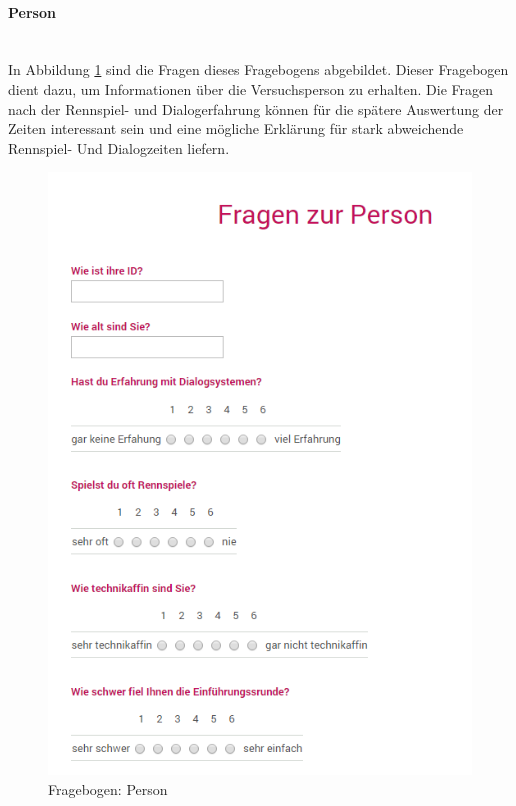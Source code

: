 \documentclass[12pt,a4paper]{scrartcl}
\begin{document}
\paragraph{Person}
\label{fbperson1}
~\\
In Abbildung \ref{fbperson} sind die Fragen dieses Fragebogens abgebildet. Dieser Fragebogen dient dazu, um Informationen über die Versuchsperson zu erhalten.
Die Fragen nach der Rennspiel- und Dialogerfahrung können für die spätere Auswertung der Zeiten interessant sein und eine mögliche Erklärung für stark abweichende Rennspiel- Und Dialogzeiten liefern. 
\begin{figure}[htbp]
\begin{center}
\includegraphics[width=12cm]{fbperson.png}
\caption{Fragebogen: Person}
\label{fbperson}
\end{center}
\end{figure}
\end{document}
